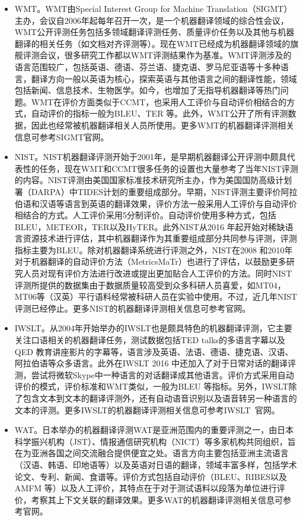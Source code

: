 \begin{appendices}
\begin{itemize}
\vspace{0.5em}
\item WMT。WMT由Special Interest Group for Machine Translation（SIGMT）主办，会议自2006年起每年召开一次，是一个机器翻译领域的综合性会议，WMT公开评测任务包括多领域翻译评测任务、质量评价任务以及其他与机器翻译的相关任务（如文档对齐评测等）。现在WMT已经成为机器翻译领域的旗舰评测会议，很多研究工作都以WMT评测结果作为基准。WMT评测涉及的语言范围较广，包括英语、德语、芬兰语、捷克语、罗马尼亚语等十多种语言，翻译方向一般以英语为核心，探索英语与其他语言之间的翻译性能，领域包括新闻、信息技术、生物医学。如今，也增加了无指导机器翻译等热门问题。WMT在评价方面类似于CCMT，也采用人工评价与自动评价相结合的方式，自动评价的指标一般为BLEU、TER 等。此外，WMT公开了所有评测数据，因此也经常被机器翻译相关人员所使用。更多WMT的机器翻译评测相关信息可参考SIGMT官网。

\vspace{0.5em}
\item NIST。NIST机器翻译评测开始于2001年，是早期机器翻译公开评测中颇具代表性的任务，现在WMT和CCMT很多任务的设置也大量参考了当年NIST评测的内容。NIST评测由美国国家标准技术研究所主办，作为美国国防高级计划署（DARPA）中TIDES计划的重要组成部分。早期，NIST评测主要评价阿拉伯语和汉语等语言到英语的翻译效果，评价方法一般采用人工评价与自动评价相结合的方式。人工评价采用5分制评价。自动评价使用多种方式，包括BLEU，METEOR，TER以及HyTER。此外NIST从2016 年起开始对稀缺语言资源技术进行评估，其中机器翻译作为其重要组成部分共同参与评测，评测指标主要为BLEU。除对机器翻译系统进行评测之外，NIST在2008 和2010年对于机器翻译的自动评价方法（MetricsMaTr）也进行了评估，以鼓励更多研究人员对现有评价方法进行改进或提出更加贴合人工评价的方法。同时NIST评测所提供的数据集由于数据质量较高受到众多科研人员喜爱，如MT04，MT06等（汉英）平行语料经常被科研人员在实验中使用。不过，近几年NIST评测已经停止。更多NIST的机器翻译评测相关信息可参考官网。

\vspace{0.5em}
\item IWSLT。从2004年开始举办的IWSLT也是颇具特色的机器翻译评测，它主要关注口语相关的机器翻译任务，测试数据包括TED talks的多语言字幕以及QED 教育讲座影片的字幕等，语言涉及英语、法语、德语、捷克语、汉语、阿拉伯语等众多语言。此外在IWSLT 2016 中还加入了对于日常对话的翻译评测，尝试将微软Skype中一种语言的对话翻译成其他语言。评价方式采用自动评价的模式，评价标准和WMT类似，一般为BLEU 等指标。另外，IWSLT除了包含文本到文本的翻译评测外，还有自动语音识别以及语音转另一种语言的文本的评测。更多IWSLT的机器翻译评测相关信息可参考IWSLT\ 官网。

\vspace{0.5em}
\item WAT。日本举办的机器翻译评测WAT是亚洲范围内的重要评测之一，由日本科学振兴机构（JST）、情报通信研究机构（NICT）等多家机构共同组织，旨在为亚洲各国之间交流融合提供便宜之处。语言方向主要包括亚洲主流语言（汉语、韩语、印地语等）以及英语对日语的翻译，领域丰富多样，包括学术论文、专利、新闻、食谱等。评价方式包括自动评价（BLEU、RIBES以及AMFM 等）以及人工评价，其特点在于对于测试语料以段落为单位进行评价，考察其上下文关联的翻译效果。更多WAT的机器翻译评测相关信息可参考官网。


\end{itemize}
\end{appendices}
